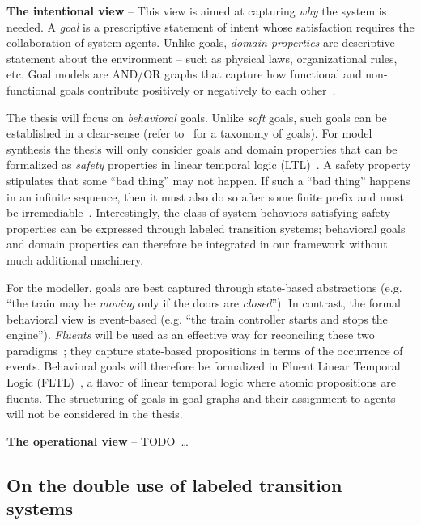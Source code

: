 \noindent \textbf{The intentional view} -- This view is aimed at capturing \emph{why} the system is needed. A \emph{goal} is a prescriptive statement of intent whose satisfaction requires the collaboration of system agents. Unlike goals, \emph{domain properties} are descriptive statement about the environment -- such as physical laws, organizational rules, etc. Goal models are AND/OR graphs that capture how functional and non-functional goals contribute positively or negatively to each other~\cite{VanLamsweerde:2000, VanLamsweerde:2004}.

The thesis will focus on \emph{behavioral} goals. Unlike \emph{soft} goals, such goals can be established in a clear-sense (refer to~\cite{VanLamsweerde:2009} for a taxonomy of goals). For model synthesis the thesis will only consider goals and domain properties that can be formalized as \emph{safety} properties in linear temporal logic (LTL)~\cite{Manna:1992}. A safety property stipulates that some ``bad thing'' may not happen. If such a ``bad thing'' happens in an infinite sequence, then it must also do so after some finite prefix and must be irremediable~\cite{Alpern:1986, Giannakopoulou:1999}. Interestingly, the class of system behaviors satisfying safety properties can be expressed through labeled transition systems; behavioral goals and domain properties can therefore be integrated in our framework without much additional machinery.

For the modeller, goals are best captured through state-based abstractions (e.g. ``the train may be \emph{moving} only if the doors are \emph{closed}''). In contrast, the formal behavioral view is event-based (e.g. ``the train controller starts and stops the engine''). \emph{Fluents} will be used as an effective way for reconciling these two paradigms~\cite{Miller:2002}; they capture state-based propositions in terms of the occurrence of events. Behavioral goals will therefore be formalized in Fluent Linear Temporal Logic (FLTL)~\cite{Giannakopoulou:2003}, a flavor of linear temporal logic where atomic propositions are fluents. The structuring of goals in goal graphs and their assignment to agents will not be considered in the thesis.

\noindent \textbf{The operational view} -- TODO~\ldots

\subsection{On the double use of labeled transition systems}

